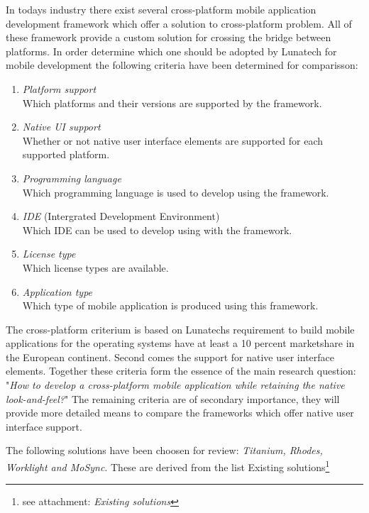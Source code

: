 In todays industry there exist several cross-platform mobile application development framework which offer a solution to cross-platform problem. All of these framework provide a custom solution for crossing the bridge between platforms. In order determine which one should be adopted by Lunatech for mobile development the following criteria have been determined for comparisson:

\begin{enumerate}
\item \emph{Platform support}\\
Which platforms and their versions are supported by the framework.
\item \emph{Native UI support}\\
Whether or not native user interface elements are supported for each supported platform.
\item \emph{Programming language}\\
Which programming language is used to develop using the framework.
\item \emph{IDE} (Intergrated Development Environment)\\
Which IDE can be used to develop using with the framework.
\item \emph{License type}\\
Which license types are available.
\item \emph{Application type}\\
Which type of mobile application is produced using this framework.
\end{enumerate}

The cross-platform criterium is based on Lunatechs requirement to build mobile applications for the operating systems have at least a 10 percent marketshare in the European continent. Second  comes the support for native user interface elements. Together these criteria form the essence of the main research question: "\emph{How to develop a cross-platform mobile application while retaining the native look-and-feel?}"
The remaining criteria are of secondary importance, they will provide more detailed means to compare the frameworks which offer native user interface support.

The following solutions have been choosen for review: \emph{Titanium, Rhodes, Worklight and MoSync}. These are derived from the list Existing solutions\footnote{see attachment: \emph{Existing solutions}} %


